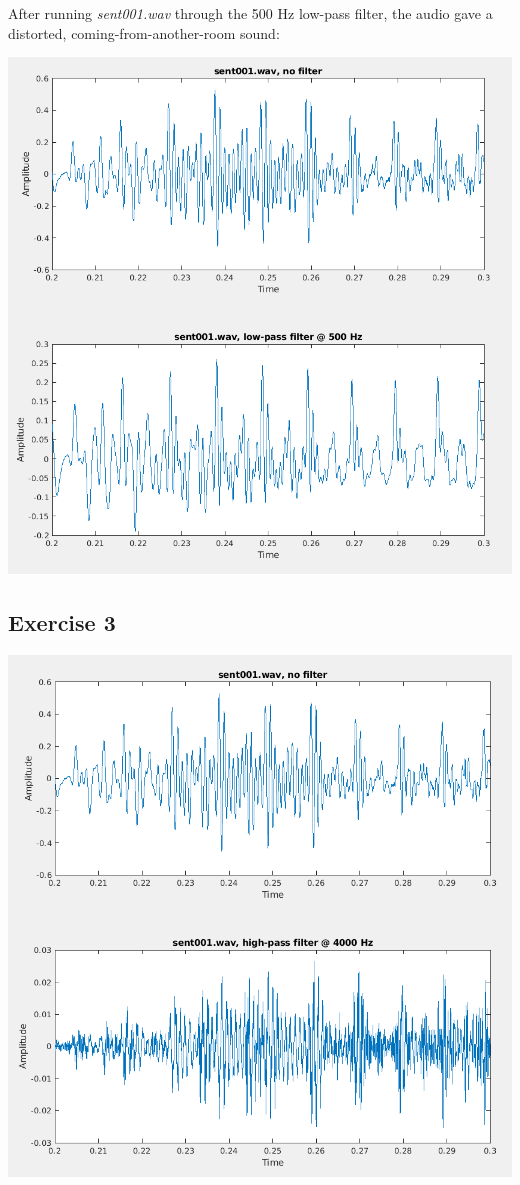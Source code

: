 \documentclass[11pt]{article}
\begin{document}
After running \textit{sent001.wav} through the 500 Hz low-pass filter, the audio gave a distorted, coming-from-another-room sound:



\includegraphics[width=\textwidth]{exercise2.png}

\subsection{Exercise 3}



\includegraphics[width=\textwidth]{exercise3.png}
\end{document}
